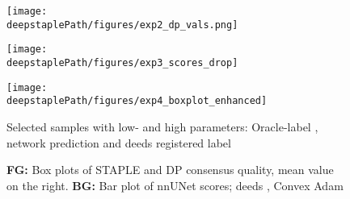     \begin{figure}
        \centering
        \begin{minipage}[b]{0.31\textwidth}
            \centering
            \texttt{[image: \\deepstaplePath/figures/exp2\_dp\_vals.png]}
        \end{minipage}
        \hfill
        \begin{minipage}[b]{0.31\textwidth}
            \centering
            \texttt{[image: \\deepstaplePath/figures/exp3\_scores\_drop]}
        \end{minipage}
        \hfill
        \begin{minipage}[b]{0.33\textwidth}
            \centering
            \texttt{[image: \\deepstaplePath/figures/exp4\_boxplot\_enhanced]}
        \end{minipage}
        \par
        \begin{minipage}{0.31\linewidth}
            \caption{Selected samples with low- and high parameters: Oracle-label , network prediction  and deeds registered label } \label{fig:epx2_dp_vals}
        \end{minipage}
        \hfill
        \begin{minipage}{0.31\linewidth}
            \caption{%
                Inline  and out-of-line  backpropagation. Validation Dice (\sampleline{}) and Spearman-corr. of params. and oracle-Dice ()%
            } \label{fig:exp3_scores_drop}
        \end{minipage}
        \hfill
        \begin{minipage}{0.33\linewidth}
            \caption{\textbf{FG:} Box plots of STAPLE and DP consensus quality, mean value on the right. \textbf{BG:} Bar plot of nnUNet scores; deeds , Convex Adam }
            \label{fig:exp4_boxplot}
        \end{minipage}
    \end{figure}

